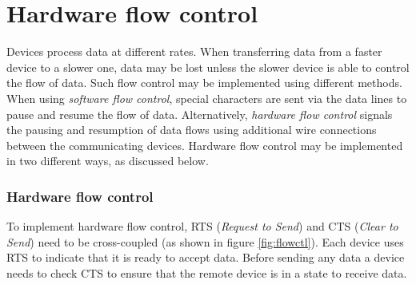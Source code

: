 \documentclass[a4paper,11pt,twoside,openright]{report}
\begin{document}


\clearpage
\section*{Hardware flow control}
Devices process data at different rates. When transferring data from a faster device to a slower one, data may be lost unless the slower device is able to control the flow of data. Such flow control may be implemented using different methods. When using \textit{software flow control}, special characters are sent via the data lines to pause and resume the flow of data. Alternatively, \textit{hardware flow control} signals the pausing and resumption of data flows using additional wire connections between the communicating devices. Hardware flow control may be implemented in two different ways, as discussed below.

\subsubsection*{Hardware flow control}
To implement hardware flow control, RTS (\textit{Request to Send}) and CTS (\textit{Clear to Send}) need to be cross-coupled (as shown in figure \ref{fig:flowctl}). Each device uses RTS to indicate that it is ready to accept data. Before sending any data a device needs to check CTS to ensure that the remote device is in a state to receive data.
\end{document}
